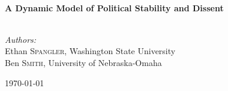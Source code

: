 \documentclass[12pt]{article}
\begin{document}
  


\begin{titlepage}
	\begin{center}

\vspace*{10 em}
\toprule[1.0pt]\\[0.2cm]
{ \huge \bfseries A Dynamic Model of Political Stability and Dissent \\[0.2cm] }
\bottomrule[1.0pt]

\large
\\[1.2cm]
\emph{Authors:}\\
Ethan \textsc{Spangler}, Washington State University\\
Ben \textsc{Smith}, University of Nebraska-Omaha 



\vfill

{\large \today}
\end{center}
\end{titlepage}
\end{document}
